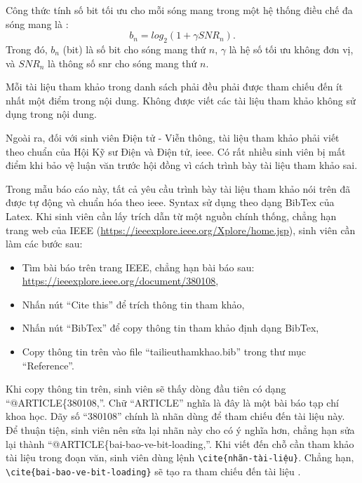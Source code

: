 	\begin{exam}
		Công thức tính số bit tối ưu cho mỗi sóng mang trong một hệ thống điều chế đa sóng mang là  \cite{bai-bao-ve-bit-loading}:
			\begin{equation}
			b_n= log_2 \left( 1 + \gamma {SNR}_n \right).
			\label{eq:bitloading}
			\end{equation}
		Trong đó, $b_n$ (bit) là số bit cho sóng mang thứ $n$, $\gamma$ là hệ số tối ưu không đơn vị, và ${SNR}_n$ là thông số \ac{snr} cho sóng mang thứ $n$.
	\end{exam}
	
	Mỗi tài liệu tham khảo trong danh sách phải đều phải được tham chiếu đến ít nhất một điểm trong nội dung. 
	Không được viết các tài liệu tham khảo không sử dụng trong nội dung.
	
	Ngoài ra, đối với sinh viên Điện tử - Viễn thông, tài liệu tham khảo phải viết theo chuẩn của Hội Kỹ sư Điện và Điện tử, \ac{ieee}.
	Có rất nhiều sinh viên bị mất điểm khi bảo vệ luận văn trước hội đồng vì cách trình bày tài liệu tham khảo sai.
	
	Trong mẫu báo cáo này, tất cả yêu cầu trình bày tài liệu tham khảo nói trên đã được tự động và chuẩn hóa theo \ac{ieee}.
	Syntax sử dụng theo dạng BibTex của Latex.
	Khi sinh viên cần lấy trích dẫn từ một nguồn chính thống, chẳng hạn trang web của IEEE (\url{https://ieeexplore.ieee.org/Xplore/home.jsp}), sinh viên cần làm các bước sau:
	\begin{itemize}
		\item Tìm bài báo trên trang IEEE, chẳng hạn bài báo sau: \url{https://ieeexplore.ieee.org/document/380108},
		\item Nhấn nút ``Cite this'' để trích thông tin tham khảo,
		\item Nhấn nút ``BibTex'' để copy thông tin tham khảo định dạng BibTex,
		\item Copy thông tin trên vào file ``tailieuthamkhao.bib'' trong thư mục ``Reference''.
	\end{itemize}
	
	Khi copy thông tin trên, sinh viên sẽ thấy dòng đầu tiên có dạng ``@ARTICLE\{380108,''.
	Chữ ``ARTICLE'' nghĩa là đây là một bài báo tạp chí khoa học.
	Dãy số ``380108'' chính là nhãn dùng để tham chiếu đến tài liệu này.
	Để thuận tiện, sinh viên nên sửa lại nhãn này cho có ý nghĩa hơn, chẳng hạn sửa lại thành ``@ARTICLE\{bai-bao-ve-bit-loading,''.
	Khi viết đến chỗ cần tham khảo tài liệu trong đoạn văn, sinh viên dùng lệnh \verb|\cite{nhãn-tài-liệu}|.
	Chẳng hạn, \verb|\cite{bai-bao-ve-bit-loading}| sẽ tạo ra tham chiếu đến tài liệu 
	\cite{bai-bao-ve-bit-loading}.
	
